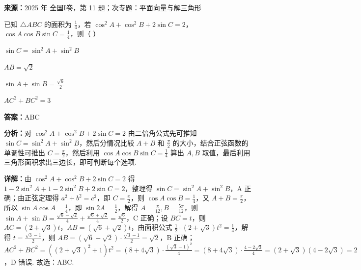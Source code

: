 \begin{question}[points=6]
\textbf{来源：}2025 年 全国I卷，第 11 题；次专题：平面向量与解三角形\par
已知 $\triangle ABC$ 的面积为 $\frac{1}{4}$，若 $\cos^2 A + \cos^2 B + 2\sin C = 2$，$\cos A \cos B \sin C = \frac{1}{4}$，则（ ）
\begin{choices}
  \item $\sin C = \sin^2 A + \sin^2 B$
  \item $AB = \sqrt{2}$
  \item $\sin A + \sin B = \frac{\sqrt{6}}{2}$
  \item $AC^2 + BC^2 = 3$
\end{choices}
\begin{solution}
\textbf{答案：}ABC

\textbf{分析：}对 $\cos^2 A + \cos^2 B + 2\sin C = 2$ 由二倍角公式先可推知 $\sin C = \sin^2 A + \sin^2 B$，然后分情况比较 $A+B$ 和 $\frac{\pi}{2}$ 的大小，结合正弦函数的单调性可推出 $C = \frac{\pi}{2}$，然后利用 $\cos A \cos B \sin C = \frac{1}{4}$ 算出 $A,B$ 取值，最后利用三角形面积求出三边长，即可判断每个选项.

\textbf{详解：}由 $\cos^2 A + \cos^2 B + 2\sin C = 2$ 得 $1-2\sin^2 A + 1-2\sin^2 B + 2\sin C = 2$，整理得 $\sin C = \sin^2 A + \sin^2 B$，A 正确；由正弦定理得 $a^2+b^2=c^2$，即 $C = \frac{\pi}{2}$，则 $\cos A \cos B = \frac{1}{4}$，又 $A+B=\frac{\pi}{2}$，所以 $\sin A \cos A = \frac{1}{4}$，即 $\sin 2A = \frac{1}{2}$，解得 $A = \frac{\pi}{12}, B = \frac{5\pi}{12}$，则 $\sin A + \sin B = \frac{\sqrt{6}-\sqrt{2}}{4} + \frac{\sqrt{6}+\sqrt{2}}{4} = \frac{\sqrt{6}}{2}$，C 正确；设 $BC = t$，则 $AC = (2+\sqrt{3})t$，$AB = (\sqrt{6}+\sqrt{2})t$，由面积公式 $\frac{1}{2} \cdot (2+\sqrt{3})t^2 = \frac{1}{4}$，解得 $t = \frac{\sqrt{3}-1}{2}$，则 $AB = (\sqrt{6}+\sqrt{2}) \cdot \frac{\sqrt{3}-1}{2} = \sqrt{2}$，B 正确；$AC^2+BC^2 = ((2+\sqrt{3})^2+1)t^2 = (8+4\sqrt{3}) \cdot \frac{(\sqrt{3}-1)^2}{4} = (8+4\sqrt{3}) \cdot \frac{4-2\sqrt{3}}{4} = (2+\sqrt{3})(4-2\sqrt{3}) = 2$，D 错误. 故选：ABC.
\end{solution}
\end{question}

